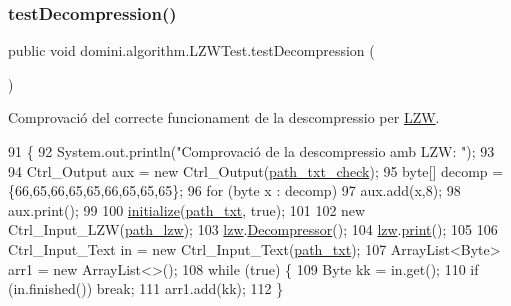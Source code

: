 \subsubsection{\texorpdfstring{test\+Decompression()}{testDecompression()}}
{\footnotesize\ttfamily public void domini.\+algorithm.\+L\+Z\+W\+Test.\+test\+Decompression (\begin{DoxyParamCaption}{ }\end{DoxyParamCaption})\hspace{0.3cm}{\ttfamily [inline]}}



Comprovació del correcte funcionament de la descompressio per \hyperlink{classdomini_1_1algorithm_1_1LZW}{L\+ZW}. 


\begin{DoxyCode}
91                                     \{
92         System.out.println(\textcolor{stringliteral}{"Comprovació de la descompressio amb LZW: "});
93         
94         Ctrl\_Output aux = \textcolor{keyword}{new} Ctrl\_Output(\hyperlink{classdomini_1_1algorithm_1_1LZWTest_add9dbf2d86413bf9f7bcdd23b268c288}{path\_txt\_check});
95         byte[] decomp = \{66,65,66,65,65,66,65,65,65\};
96         \textcolor{keywordflow}{for} (byte x : decomp) 
97             aux.add(x,8);
98         aux.print();
99         
100         \hyperlink{classdomini_1_1algorithm_1_1LZWTest_acf4cac88aafa2144dc8ce3a80453fa90}{initialize}(\hyperlink{classdomini_1_1algorithm_1_1LZWTest_a4194ade234060b69729a0380ff4ae33d}{path\_txt}, \textcolor{keyword}{true});
101 
102         \textcolor{keyword}{new} Ctrl\_Input\_LZW(\hyperlink{classdomini_1_1algorithm_1_1LZWTest_af5091e6df88845c585e92165f2fae2dc}{path\_lzw});
103         \hyperlink{classdomini_1_1algorithm_1_1LZWTest_a591c1bb9b927631d0e60a2853e502d20}{lzw}.\hyperlink{classdomini_1_1algorithm_1_1LZW_a6a5d986396443691861ac9ba41b2dd33}{Decompressor}();
104         \hyperlink{classdomini_1_1algorithm_1_1LZWTest_a591c1bb9b927631d0e60a2853e502d20}{lzw}.\hyperlink{classdomini_1_1algorithm_1_1Algorithm_a5546f991f9d71d012d6ded5f2d4181cb}{print}();
105 
106         Ctrl\_Input\_Text in = \textcolor{keyword}{new} Ctrl\_Input\_Text(\hyperlink{classdomini_1_1algorithm_1_1LZWTest_a4194ade234060b69729a0380ff4ae33d}{path\_txt});
107         ArrayList<Byte> arr1 = \textcolor{keyword}{new} ArrayList<>();
108         \textcolor{keywordflow}{while} (\textcolor{keyword}{true}) \{
109             Byte kk = in.get();
110             \textcolor{keywordflow}{if} (in.finished()) \textcolor{keywordflow}{break};
111             arr1.add(kk);
112         \}

\end{DoxyCode}
